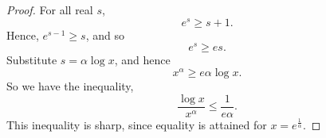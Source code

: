 \documentclass{unswmaths}
\begin{document}
\begin{proof}
    For all real $s$,
    \begin{equation*}
        e^s \geq s+1.
    \end{equation*}
    Hence, $e^{s-1} \geq s$, and so
    \begin{equation*}
        e^s \geq es.
    \end{equation*}
    Substitute $s = \alpha\log{x}$, and hence
    \begin{equation*}
        x^\alpha \geq e\alpha\log{x}.
    \end{equation*}
    So we have the inequality,
    \begin{equation*}
        \frac{\log{x}}{x^\alpha} \leq \frac{1}{e\alpha}.
    \end{equation*}
    This inequality is sharp, since equality is attained for $x = e^\frac{1}{\alpha}$.    
%    
%     
\end{proof}
\end{document}
